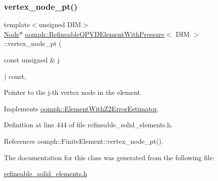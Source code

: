 \subsubsection{\texorpdfstring{vertex\+\_\+node\+\_\+pt()}{vertex\_node\_pt()}}
{\footnotesize\ttfamily template$<$unsigned D\+IM$>$ \\
\hyperlink{classoomph_1_1Node}{Node}$\ast$ \hyperlink{classoomph_1_1RefineableQPVDElementWithPressure}{oomph\+::\+Refineable\+Q\+P\+V\+D\+Element\+With\+Pressure}$<$ D\+IM $>$\+::vertex\+\_\+node\+\_\+pt (\begin{DoxyParamCaption}\item[{const unsigned \&}]{j }\end{DoxyParamCaption}) const\hspace{0.3cm}{\ttfamily [inline]}, {\ttfamily [virtual]}}



Pointer to the j-\/th vertex node in the element. 



Implements \hyperlink{classoomph_1_1ElementWithZ2ErrorEstimator_a0eedccc33519f852c5dc2055ddf2774b}{oomph\+::\+Element\+With\+Z2\+Error\+Estimator}.



Definition at line 444 of file refineable\+\_\+solid\+\_\+elements.\+h.



References oomph\+::\+Finite\+Element\+::vertex\+\_\+node\+\_\+pt().



The documentation for this class was generated from the following file\+:\begin{DoxyCompactItemize}
\item 
\hyperlink{refineable__solid__elements_8h}{refineable\+\_\+solid\+\_\+elements.\+h}\end{DoxyCompactItemize}
